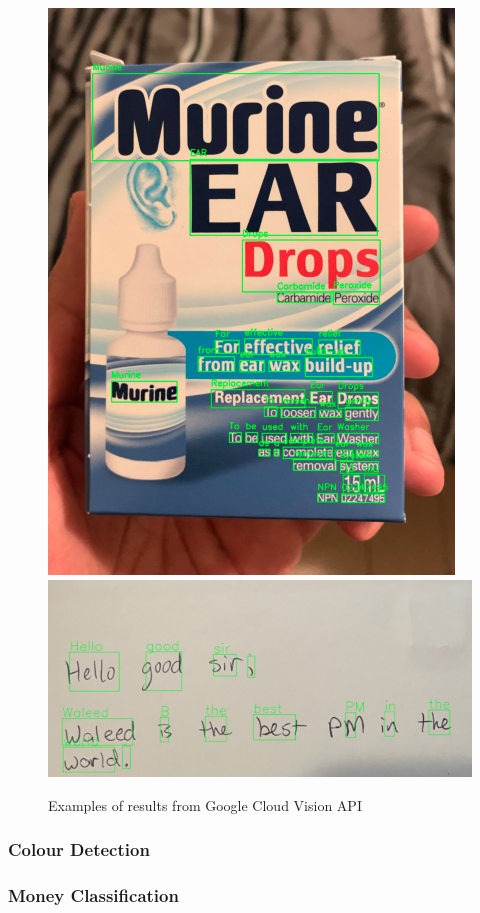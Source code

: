 \documentclass[a4paper,11pt]{article}
\begin{document}
\begin{figure}[H]
\centering
\includegraphics[scale=0.5]{img/cv/ocr_text_in_the_wild.png}
\includegraphics[scale=0.5]{img/cv/ocr_handwriting.png}
\caption{Examples of results from Google Cloud Vision API}
\label{fig:google_vision_examples}
\end{figure}


\subsubsection{Colour Detection}

\subsubsection{Money Classification}
\end{document}

